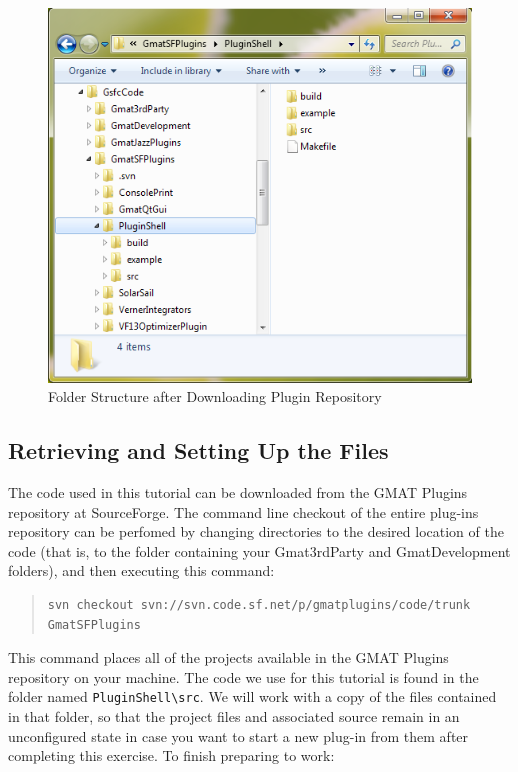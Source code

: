\documentclass[10pt,letterpaper]{article}
\begin{document}
\begin{figure}[htb]
\begin{center}
\includegraphics[scale=0.5]{images/FileStructure.png} 
\caption{\label{files}Folder Structure after Downloading Plugin Repository}
\end{center}
\end{figure}

\subsection{\label{settingUp}Retrieving and Setting Up the Files}

The code used in this tutorial can be downloaded from the GMAT Plugins repository at SourceForge.  The command line checkout of the entire plug-ins repository can be perfomed by changing directories to the desired location of the code (that is, to the folder containing your Gmat3rdParty and GmatDevelopment folders), and then executing this command:
\begin{quote}
\begin{verbatim}
svn checkout svn://svn.code.sf.net/p/gmatplugins/code/trunk GmatSFPlugins
\end{verbatim}
\end{quote}
\noindent This command places all of the projects available in the GMAT Plugins repository on your machine.  The code we use for this tutorial is found in the folder named \texttt{PluginShell{\textbackslash}src}.  We will work with a copy of the files contained in that folder, so that the project files and associated source remain in an unconfigured state in case you want to start a new plug-in from them after completing this exercise.  To finish preparing to work:
\end{document}
